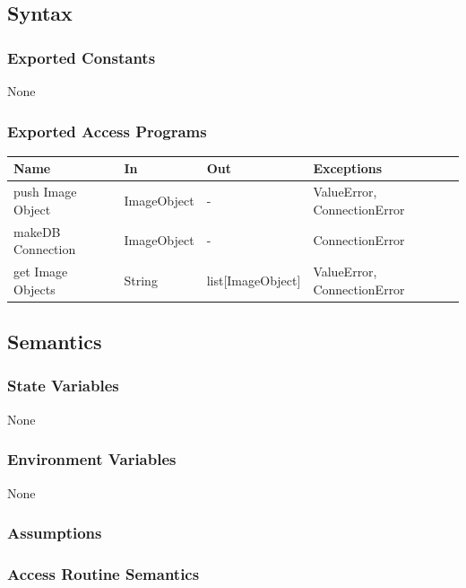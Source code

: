 \documentclass[12pt, titlepage]{article}
\begin{document}
  
  \subsection{Syntax}


  
  \subsubsection{Exported Constants}
  None
  \subsubsection{Exported Access Programs}
  
  \begin{center}
  \begin{tabular}{p{2cm} p{4cm} p{4cm} p{2cm}}
  \hline
  \textbf{Name} & \textbf{In} & \textbf{Out} & \textbf{Exceptions} \\
  \hline
  push Image Object & ImageObject & - & ValueError, ConnectionError \\
  \hline
  makeDB Connection & ImageObject & - & ConnectionError \\
  \hline
  get Image Objects & String & list[ImageObject] & ValueError, ConnectionError \\
  \hline
  \end{tabular}
  \end{center}
  
  \subsection{Semantics}
  
  \subsubsection{State Variables}
  
  None
  
  \subsubsection{Environment Variables}
  
  None
  
  \subsubsection{Assumptions}
  
  
  \subsubsection{Access Routine Semantics}
  
\end{document}
